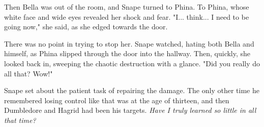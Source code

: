 Then Bella was out of the room, and Snape turned to Phina. To Phina, whose white face and wide eyes revealed her shock and fear. "I... think... I need to be going now," she said, as she edged towards the door.

There was no point in trying to stop her. Snape watched, hating both Bella and himself, as Phina slipped through the door into the hallway. Then, quickly, she looked back in, sweeping the chaotic destruction with a glance. "Did you really do all that? Wow!"

Snape set about the patient task of repairing the damage. The only other time he remembered losing control like that was at the age of thirteen, and then Dumbledore and Hagrid had been his targets. \emph{Have I truly learned so little in all that time?}


